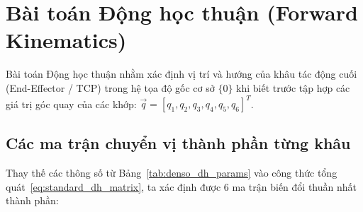 \begin{table}[htbp]
\centering
\caption{Bảng thông số D-H tiêu chuẩn (Standard D-H) của Robot Denso VS-6556 (6-DOF)}
\label{tab:denso_dh_params}
\end{table}

\section{Bài toán Động học thuận (Forward Kinematics)}
\label{sec:forward_kinematics}

Bài toán Động học thuận nhằm xác định vị trí và hướng của khâu tác động cuối (End-Effector / TCP) trong hệ tọa độ gốc cơ sở $\{0\}$ khi biết trước tập hợp các giá trị góc quay của các khớp: $\vec{q} = [q_1, q_2, q_3, q_4, q_5, q_6]^T$.

\subsection{Các ma trận chuyển vị thành phần từng khâu}

Thay thế các thông số từ Bảng~\ref{tab:denso_dh_params} vào công thức tổng quát~\eqref{eq:standard_dh_matrix}, ta xác định được 6 ma trận biến đổi thuần nhất thành phần:

